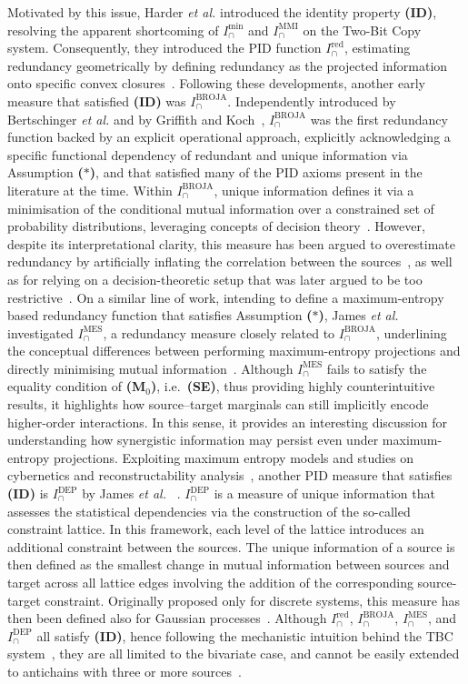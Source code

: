\documentclass{article}
\makeatletter
\newcommand{\etal}{\textit{et al.\@} }
\newcommand{\ts}[1]{\ensuremath{_{\text{#1}}}}
\newcommand{\Mz}{\textbf{(M\ts{0})}\xspace} %
\newcommand{\ID}{\textbf{(ID)}\xspace} %
\newcommand{\AST}{\textbf{($\boldsymbol{\ast}$)}\xspace} %
\newcommand{\SE}{\textbf{(SE)}\xspace} %
\newcommand{\Imin}{\ensuremath{I_\cap^{\text{min}}}\xspace}
\newcommand{\Ired}{\ensuremath{I^{\text{red}}_\cap}\xspace}
\newcommand{\IBROJA}{\ensuremath{I_\cap^{\text{BROJA}}}\xspace}
\newcommand{\IMMI}{\ensuremath{I_\cap^{\text{MMI}}}\xspace}
\newcommand{\IDEP}{\ensuremath{I_\cap^{\text{DEP}}}\xspace}
\newcommand{\IMES}{\ensuremath{I_\cap^{\text{MES}}}\xspace}
\makeatother
\begin{document}
Motivated by this issue, Harder \etal introduced the identity property \ID, resolving the apparent shortcoming of \Imin and \IMMI on the Two-Bit Copy system. Consequently, they introduced the PID function \Ired, estimating redundancy geometrically by defining redundancy as the projected information onto specific convex closures~\cite{harder2013bivariate}. 
Following these developments, another early measure that satisfied \ID was \IBROJA. Independently introduced by Bertschinger \etal and by Griffith and Koch~\cite{bertschinger2014quantifying, griffith2014quantifying}, \IBROJA was the first redundancy function backed by an explicit operational approach, explicitly acknowledging a specific functional dependency of redundant and unique information via Assumption \AST, and that satisfied many of the PID axioms present in the literature at the time. Within \IBROJA, unique information defines it via a minimisation of the conditional mutual information over a constrained set of probability distributions, leveraging concepts of decision theory~\cite{bertschinger2014quantifying}. However, despite its interpretational clarity, this measure has been argued to overestimate redundancy by artificially inflating the correlation between the sources~\cite{ince2017measuring, james2018uniquekey, james2018unique}, as well as for relying on a decision-theoretic setup that was later argued to be too restrictive~\cite{ince2017measuring}.
On a similar line of work, intending to define a maximum-entropy based redundancy function that satisfies Assumption \AST, James \etal investigated \IMES, a redundancy measure closely related to \IBROJA, underlining the conceptual differences between performing maximum-entropy projections and directly minimising mutual information~\cite{james2018uniquekey}. Although \IMES fails to satisfy the equality condition of \Mz, i.e.\ \SE, thus providing highly counterintuitive results, it highlights how source–target marginals can still implicitly encode higher-order interactions. In this sense, it provides an interesting discussion for understanding how synergistic information may persist even under maximum-entropy projections.
Exploiting maximum entropy models and studies on cybernetics and reconstructability analysis~\cite{zwick2004overview, krippendorff2009ross}, another PID measure that satisfies \ID is \IDEP by James \etal~\cite{james2018unique}. \IDEP is a measure of unique information that assesses the statistical dependencies via the construction of the so-called constraint lattice. In this framework, each level of the lattice introduces an additional constraint between the sources. The unique information of a source is then defined as the smallest change in mutual information between sources and target across all lattice edges involving the addition of the corresponding source-target constraint. Originally proposed only for discrete systems, this measure has then been defined also for Gaussian processes~\cite{kay2018exact}.
Although \Ired, \IBROJA, \IMES, and \IDEP all satisfy \ID, hence following the mechanistic intuition behind the TBC system~\cite{harder2013bivariate}, they are all limited to the bivariate case, and cannot be easily extended to antichains with three or more sources~\cite{harder2013bivariate, bertschinger2014blackwell, james2018unique, james2018uniquekey}.
\end{document}
